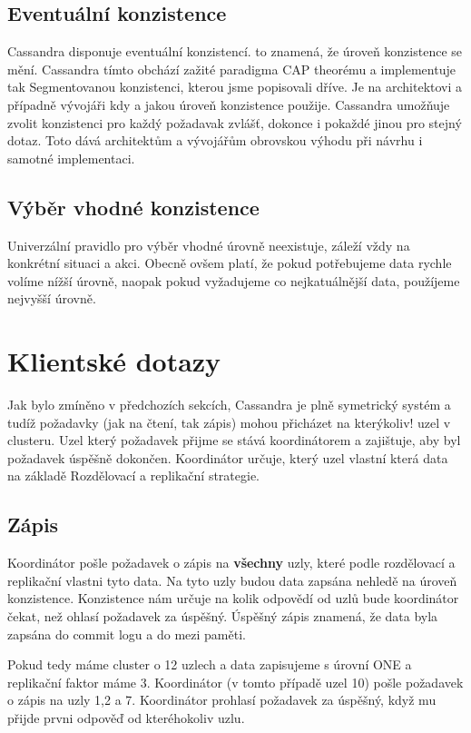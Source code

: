 \subsection{Eventuální konzistence}
Cassandra disponuje eventuální konzistencí. to znamená, že úroveň konzistence se mění. Cassandra tímto obchází zažité paradigma CAP theorému a implementuje tak Segmentovanou konzistenci, kterou jsme popisovali dříve. Je na architektovi a případně vývojáři kdy a jakou úroveň konzistence použije. Cassandra umožňuje zvolit  konzistenci pro každý požadavak zvlášť, dokonce i pokaždé jinou pro stejný dotaz. Toto dává architektům a vývojářům obrovskou výhodu při návrhu i samotné implementaci. 

\subsection{Výběr vhodné konzistence}
Univerzální pravidlo pro výběr vhodné úrovně neexistuje, záleží vždy na konkrétní situaci a akci. Obecně ovšem platí, že pokud potřebujeme data rychle volíme nížší úrovně, naopak pokud vyžadujeme co nejkatuálnější data, použíjeme nejvyšší úrovně. 

\section{Klientské dotazy}
Jak bylo zmíněno v předchozích sekcích, Cassandra je plně symetrický systém a tudíž požadavky (jak na čtení, tak zápis) mohou přicházet na kterýkoliv! uzel v clusteru. Uzel který požadavek přijme se stává koordinátorem a zajištuje, aby byl požadavek úspěšně dokončen. Koordinátor určuje, který uzel vlastní která data na základě Rozdělovací a replikační strategie. 

\subsection{Zápis}
Koordinátor pošle požadavek o zápis na \textbf{všechny} uzly, které podle  rozdělovací a replikační vlastni tyto data. Na tyto uzly budou data zapsána nehledě na úroveň konzistence. Konzistence nám určuje na kolik odpovědí od uzlů bude koordinátor čekat, než ohlasí požadavek za úspěšný. Úspěšný zápis znamená, že data byla zapsána do commit logu a do mezi paměti. 

Pokud tedy máme cluster o 12 uzlech a data zapisujeme s úrovní ONE a replikační faktor máme 3. Koordinátor (v tomto případě uzel 10) pošle požadavek o zápis na uzly 1,2 a 7. Koordinátor prohlasí požadavek za úspěšný, když mu přijde prvni odpověď od kteréhokoliv uzlu.

